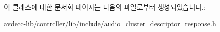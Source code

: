 이 클래스에 대한 문서화 페이지는 다음의 파일로부터 생성되었습니다.\+:\begin{DoxyCompactItemize}
\item 
avdecc-\/lib/controller/lib/include/\hyperlink{audio__cluster__descriptor__response_8h}{audio\+\_\+cluster\+\_\+descriptor\+\_\+response.\+h}\end{DoxyCompactItemize}

